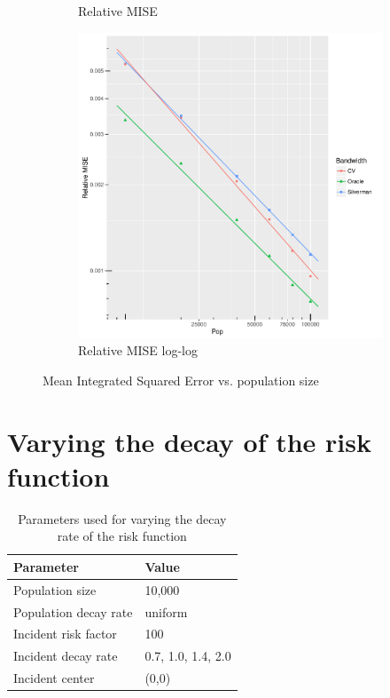 \begin{figure}[htbp]
\begin{subfigure}[b]{0.3\textwidth}
    \caption{Relative MISE}
    \end{subfigure}
    \begin{subfigure}[b]{0.3\textwidth}
    \includegraphics[width=\textwidth]{results/by_pop_size/RMISE-vs-population-log-log}
    \caption{Relative MISE log-log}
    \end{subfigure}
    \caption[MISE: by population size]{Mean Integrated Squared Error vs. population size}
    \label{fig:ise:unifNpop_1h}
\end{figure}


\section{Varying the decay of the risk function}
\label{sec:results:unif_100_SD}

\begin{table}[htbp]
\centering
\begin{tabular}{ll}
\hline
Parameter & Value \\
\hline
Population size & 10,000 \\
Population decay rate & uniform \\
Incident risk factor & 100 \\
Incident decay rate & 0.7, 1.0, 1.4, 2.0 \\
Incident center & (0,0) \\
\hline
\end{tabular}
\caption{Parameters used for varying the decay rate of the risk function}
\label{tbl:params:unif_100_SD}
\end{table}

